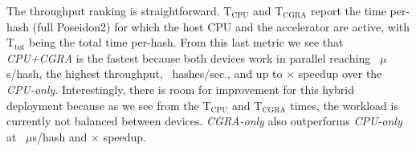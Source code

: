 \begin{table}[!ht]
\caption{Metrics for Poseidon2 kernel. T: Time ($\mu$s); Th: Throughput (hashes per sec.); Sp: Speedup; E: Energy ($\mu$J); ES: Energy Savings (\%).}
\label{tab:rtl-performance}
\centering
\footnotesize
\renewcommand{\arraystretch}{1.2}
\setlength{\tabcolsep}{2pt}
\end{table}

The throughput ranking is straightforward. T$_{\text{CPU}}$ and T$_{\text{CGRA}}$ report the time per-hash (full Poseidon2) for which the host CPU and the accelerator are active, with T$_{\text{tot}}$ being the total time per-hash. From this last metric we see that \textit{CPU+CGRA} is the fastest because both devices work in parallel reaching \MetricMerkleCoexecProjectedTimePerHashUs~$\mu$s/hash, the highest throughput, \MetricMerkleCoexecProjectedHashesPerSec~hashes/sec., and up to \MetricMerkleCoexecProjectedSpeedup $\times$ speedup over the \textit{CPU-only}. Interestingly, there is room for improvement for this hybrid deployment because as we see from the T$_{\text{CPU}}$ and T$_{\text{CGRA}}$ times, the workload is currently not balanced between devices. \textit{CGRA-only} also outperforms \textit{CPU-only} at \MetricMerkleOffloadProjectedTimePerHashUs~$\mu$s/hash and  \MetricMerkleOffloadProjectedSpeedup $\times$ speedup.


